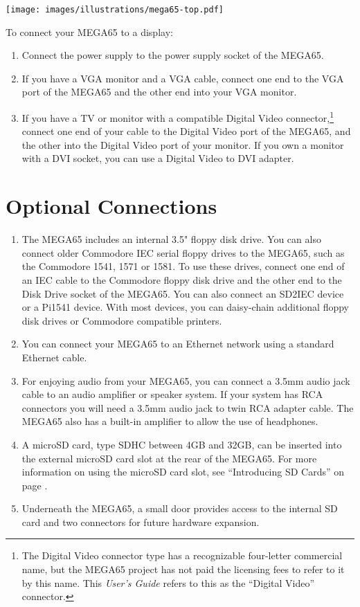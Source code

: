 \texttt{[image: images/illustrations/mega65-top.pdf]}

To connect your MEGA65 to a display:

\begin{enumerate}
	\item Connect the power supply to the power supply socket of the MEGA65.
	\item If you have a VGA monitor and a VGA cable, connect one end to the VGA port of the MEGA65 and the other end into your VGA monitor.
	\item If you have a TV or monitor with a compatible Digital Video connector,\footnote{The Digital Video connector type has a recognizable four-letter commercial name, but the MEGA65 project has not paid the licensing fees to refer to it by this name. This {\em User's Guide} refers to this as the ``Digital Video'' connector.} connect one end of your cable to the Digital Video port of the MEGA65, and the other into the Digital Video port of your monitor. If you own a monitor with a DVI socket, you can use a Digital Video to DVI adapter.
\end{enumerate}

\newpage
\section{Optional Connections}
\begin{enumerate}
	\item The MEGA65 includes an internal 3.5" floppy disk drive. You can also connect older Commodore{\textregistered} IEC serial floppy drives to the MEGA65, such as the Commodore 1541, 1571 or 1581. To use these drives, connect one end of an IEC cable to the Commodore floppy disk drive and the other end to the Disk Drive socket of the MEGA65. You can also connect an SD2IEC device or a Pi1541 device. With most devices, you can daisy-chain additional floppy disk drives or Commodore compatible printers.
	\item You can connect your MEGA65 to an Ethernet network using a standard Ethernet cable.
	\item For enjoying audio from your MEGA65, you can connect a 3.5mm audio jack cable to an audio amplifier or speaker system. If your system has RCA connectors you will need a 3.5mm audio jack to twin RCA adapter cable. The MEGA65 also has a built-in amplifier to allow the use of headphones.
	\item A microSD card, type SDHC between 4GB and 32GB, can be inserted into the external microSD card slot at the rear of the MEGA65. For more information on using the microSD card slot, see ``Introducing SD Cards'' on page \pageref{sec:introducing-sd-cards}.
	\item Underneath the MEGA65, a small door provides access to the internal SD card and two connectors for future hardware expansion.
\end{enumerate}

